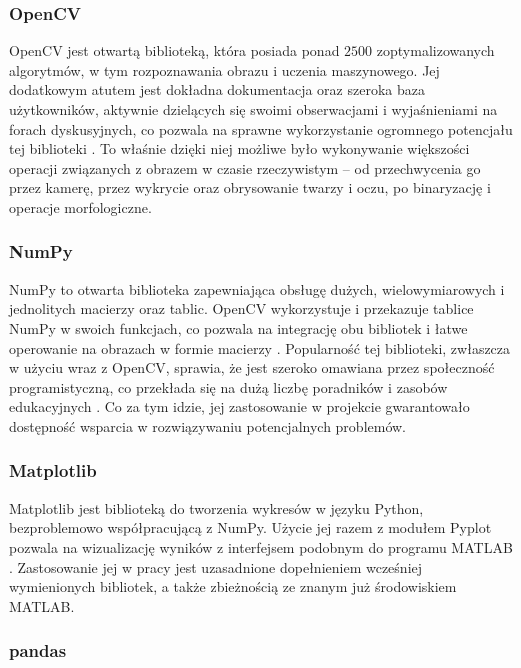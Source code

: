 \documentclass[a4paper,twoside,12pt]{book}
\begin{document}
\subsubsection{OpenCV}

OpenCV jest otwartą biblioteką, która posiada ponad $2500$ zoptymalizowanych algorytmów, w tym rozpoznawania obrazu i uczenia maszynowego. Jej dodatkowym atutem jest dokładna dokumentacja oraz szeroka baza użytkowników, aktywnie dzielących się swoimi obserwacjami i wyjaśnieniami na forach dyskusyjnych, co pozwala na sprawne wykorzystanie ogromnego potencjału tej biblioteki \cite{bib:OpenCV-about}. To właśnie dzięki niej możliwe było wykonywanie większości operacji związanych z obrazem w czasie rzeczywistym -- od przechwycenia go przez kamerę, przez wykrycie oraz obrysowanie twarzy i oczu, po binaryzację i operacje morfologiczne.

\subsubsection{NumPy}

NumPy to otwarta biblioteka zapewniająca obsługę dużych, wielowymiarowych i jednolitych macierzy oraz tablic. OpenCV wykorzystuje i przekazuje tablice NumPy w swoich funkcjach, co pozwala na integrację obu bibliotek i łatwe operowanie na obrazach w formie macierzy \cite{bib:NumPy-quick-start}. Popularność tej biblioteki, zwłaszcza w użyciu wraz z OpenCV, sprawia, że jest szeroko omawiana przez społeczność programistyczną, co przekłada się na dużą liczbę poradników i zasobów edukacyjnych \cite{bib:NumPy-OpenCV}. Co za tym idzie, jej zastosowanie w projekcie gwarantowało dostępność wsparcia w rozwiązywaniu potencjalnych problemów.

\subsubsection{Matplotlib}

Matplotlib jest biblioteką do tworzenia wykresów w języku Python, bezproblemowo współpracującą z NumPy. Użycie jej razem z modułem Pyplot pozwala na wizualizację wyników z interfejsem podobnym do programu MATLAB \cite{bib:Matplotlib-pyplot}. Zastosowanie jej w pracy jest uzasadnione dopełnieniem wcześniej wymienionych bibliotek, a także zbieżnością ze znanym już środowiskiem MATLAB.

\subsubsection{pandas}
\end{document}
